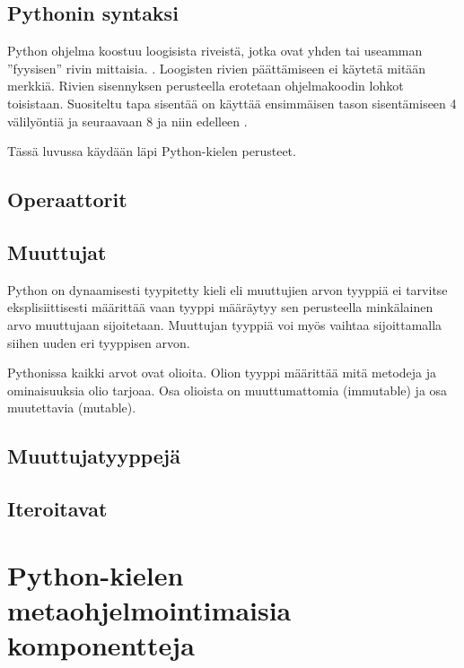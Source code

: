 \documentclass[finnish]{tktltiki2}
\theoremstyle{definition}
\theoremstyle{remark}
\begin{document}
\subsection{Pythonin syntaksi}

Python ohjelma koostuu loogisista riveistä, jotka ovat yhden tai useamman ''fyysisen'' rivin mittaisia. \cite{martelli2006python}. Loogisten rivien päättämiseen ei käytetä mitään merkkiä. Rivien sisennyksen perusteella erotetaan ohjelmakoodin lohkot toisistaan. Suositeltu tapa sisentää on käyttää ensimmäisen tason sisentämiseen 4 välilyöntiä ja seuraavaan 8 ja niin edelleen \cite{pep8}. 

Tässä luvussa käydään läpi Python-kielen perusteet.

\subsection{Operaattorit}

\subsection{Muuttujat}

Python on dynaamisesti tyypitetty kieli eli muuttujien arvon tyyppiä ei tarvitse eksplisiittisesti määrittää vaan tyyppi määräytyy sen perusteella minkälainen arvo muuttujaan sijoitetaan. Muuttujan tyyppiä voi myös vaihtaa sijoittamalla siihen uuden eri tyyppisen arvon. 

Pythonissa kaikki arvot ovat olioita. Olion tyyppi määrittää mitä metodeja ja ominaisuuksia olio tarjoaa. Osa olioista on muuttumattomia (immutable) ja osa muutettavia (mutable).


\subsection{Muuttujatyyppejä}



\subsection{Iteroitavat}

\section{Python-kielen metaohjelmointimaisia komponentteja}
\end{document}
